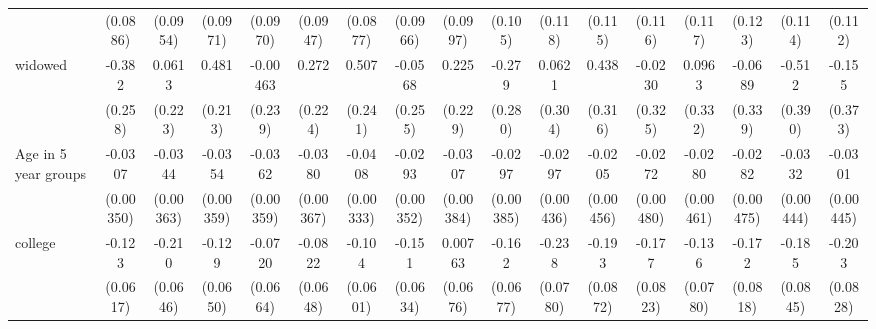 {\begin{tabular}{l*{16}{c}}
                    &    (0.0886)         &    (0.0954)         &    (0.0971)         &    (0.0970)         &    (0.0947)         &    (0.0877)         &    (0.0966)         &    (0.0997)         &     (0.105)         &     (0.118)         &     (0.115)         &     (0.116)         &     (0.117)         &     (0.123)         &     (0.114)         &     (0.112)         \\
[1em]
widowed             &      -0.382         &      0.0613         &       0.481\sym{*}  &    -0.00463         &       0.272         &       0.507\sym{*}  &     -0.0568         &       0.225         &      -0.279         &      0.0621         &       0.438         &     -0.0230         &      0.0963         &     -0.0689         &      -0.512         &      -0.155         \\
                    &     (0.258)         &     (0.223)         &     (0.213)         &     (0.239)         &     (0.224)         &     (0.241)         &     (0.255)         &     (0.229)         &     (0.280)         &     (0.304)         &     (0.316)         &     (0.325)         &     (0.332)         &     (0.339)         &     (0.390)         &     (0.373)         \\
[1em]
Age in 5 year groups&     -0.0307\sym{***}&     -0.0344\sym{***}&     -0.0354\sym{***}&     -0.0362\sym{***}&     -0.0380\sym{***}&     -0.0408\sym{***}&     -0.0293\sym{***}&     -0.0307\sym{***}&     -0.0297\sym{***}&     -0.0297\sym{***}&     -0.0205\sym{***}&     -0.0272\sym{***}&     -0.0280\sym{***}&     -0.0282\sym{***}&     -0.0332\sym{***}&     -0.0301\sym{***}\\
                    &   (0.00350)         &   (0.00363)         &   (0.00359)         &   (0.00359)         &   (0.00367)         &   (0.00333)         &   (0.00352)         &   (0.00384)         &   (0.00385)         &   (0.00436)         &   (0.00456)         &   (0.00480)         &   (0.00461)         &   (0.00475)         &   (0.00444)         &   (0.00445)         \\
[1em]
college             &      -0.123\sym{*}  &      -0.210\sym{**} &      -0.129\sym{*}  &     -0.0720         &     -0.0822         &      -0.104         &      -0.151\sym{*}  &     0.00763         &      -0.162\sym{*}  &      -0.238\sym{**} &      -0.193\sym{*}  &      -0.177\sym{*}  &      -0.136         &      -0.172\sym{*}  &      -0.185\sym{*}  &      -0.203\sym{*}  \\
                    &    (0.0617)         &    (0.0646)         &    (0.0650)         &    (0.0664)         &    (0.0648)         &    (0.0601)         &    (0.0634)         &    (0.0676)         &    (0.0677)         &    (0.0780)         &    (0.0872)         &    (0.0823)         &    (0.0780)         &    (0.0818)         &    (0.0845)         &    (0.0828)         \\

\end{tabular}}
